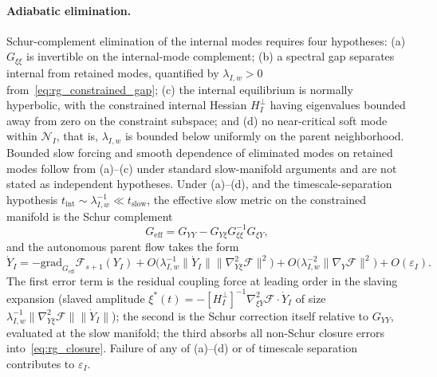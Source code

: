 \documentclass[11pt]{article}
\begin{document}
\paragraph{Adiabatic elimination.}
Schur-complement elimination of the internal modes requires four hypotheses: (a) $G_{\xi\xi}$ is invertible on the internal-mode complement; (b) a spectral gap separates internal from retained modes, quantified by $\lambda_{I,w} > 0$ from~\eqref{eq:rg_constrained_gap}; (c) the internal equilibrium is normally hyperbolic, with the constrained internal Hessian $H_I^\perp$ having eigenvalues bounded away from zero on the constraint subspace; and (d) no near-critical soft mode within $\mathcal{N}_I$, that is, $\lambda_{I,w}$ is bounded below uniformly on the parent neighborhood. Bounded slow forcing and smooth dependence of eliminated modes on retained modes follow from (a)--(c) under standard slow-manifold arguments and are not stated as independent hypotheses. Under (a)--(d), and the timescale-separation hypothesis $t_{\mathrm{int}} \sim \lambda_{I,w}^{-1} \ll t_{\mathrm{slow}}$, the effective slow metric on the constrained manifold is the Schur complement
\begin{equation}
G_{\mathrm{eff}} = G_{YY} - G_{Y\xi}G_{\xi\xi}^{-1}G_{\xi Y},
\label{eq:rg_schur}
\end{equation}
and the autonomous parent flow takes the form
\begin{equation}
\dot{Y}_I = -\mathrm{grad}_{G_{\mathrm{eff}}}\mathcal{F}_{s+1}(Y_I) + O\big(\lambda_{I,w}^{-1}\|\dot{Y}_I\| \|\nabla^2_{Y\xi}\mathcal{F}\|^2\big) + O\big(\lambda_{I,w}^{-2}\|\nabla_Y \mathcal{F}\|^2\big) + O(\varepsilon_I).
\label{eq:rg_schur_flow}
\end{equation}
The first error term is the residual coupling force at leading order in the slaving expansion (slaved amplitude $\xi^*(t) = -[H_I^\perp]^{-1}\nabla^2_{\xi Y}\mathcal{F}\cdot \dot{Y}_I$ of size $\lambda_{I,w}^{-1}\|\nabla^2_{Y\xi}\mathcal{F}\| \|\dot{Y}_I\|$); the second is the Schur correction itself relative to $G_{YY}$, evaluated at the slow manifold; the third absorbs all non-Schur closure errors into~\eqref{eq:rg_closure}. Failure of any of (a)--(d) or of timescale separation contributes to $\varepsilon_I$.
\end{document}
